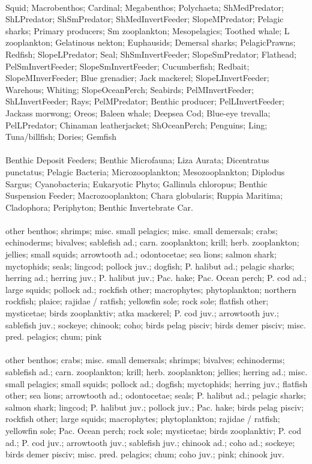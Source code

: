 \fullhline
\hline
{} \\
\hline
Squid; Macrobenthos; Cardinal; Megabenthos; Polychaeta; ShMedPredator; ShLPredator; ShSmPredator; ShMedInvertFeeder; SlopeMPredator; Pelagic sharks; Primary producers; Sm zooplankton; Mesopelagics; Toothed whale; L zooplankton; Gelatinous nekton; Euphausids; Demersal sharks; PelagicPrawns; Redfish; SlopeLPredator; Seal; ShSmInvertFeeder; SlopeSmPredator; Flathead; PelSmInvertFeeder; SlopeSmInvertFeeder; Cucumberfish; Redbait; SlopeMInverFeeder; Blue grenadier; Jack mackerel; SlopeLInvertFeeder; Warehous; Whiting; SlopeOceanPerch; Seabirds; PelMInvertFeeder; ShLInvertFeeder; Rays; PelMPredator; Benthic producer; PelLInvertFeeder; Jackass morwong; Oreos; Baleen whale; Deepsea Cod; Blue-eye trevalla; PelLPredator; Chinaman leatherjacket; ShOceanPerch; Penguins; Ling; Tuna/billfish; Dories; Gemfish\\
\fullhline
\hline
{} \\
\hline
Benthic Deposit Feeders; Benthic Microfauna; Liza Aurata; Dicentratus punctatus; Pelagic Bacteria; Microzooplankton; Mesozooplankton; Diplodus Sargus; Cyanobacteria; Eukaryotic Phyto; Gallinula chloropus; Benthic Suspension Feeder; Macrozooplankton; Chara globularis; Ruppia Maritima; Cladophora; Periphyton; Benthic Invertebrate Car.\\
\fullhline
\hline
{} \\
\hline
other benthos; shrimps; misc. small pelagics; misc. small demersals; crabs; echinoderms; bivalves; sablefish ad.; carn. zooplankton; krill; herb. zooplankton; jellies; small squids; arrowtooth ad.; odontocetae; sea lions; salmon shark; myctophids; seals; lingcod; pollock juv.; dogfish; P. halibut ad.; pelagic sharks; herring ad.; herring juv.; P. halibut juv.; Pac. hake; Pac. Ocean perch; P. cod ad.; large squids; pollock ad.; rockfish other; macrophytes; phytoplankton; northern rockfish; plaice; rajidae / ratfish; yellowfin sole; rock sole; flatfish other; mysticetae; birds zooplanktiv; atka mackerel; P. cod juv.; arrowtooth juv.; sablefish juv.; sockeye; chinook; coho; birds pelag pisciv; birds demer pisciv; misc. pred. pelagics; chum; pink\\
\fullhline
\hline
{} \\
\hline
other benthos; crabs; misc. small demersals; shrimps; bivalves; echinoderms; sablefish ad.; carn. zooplankton; krill; herb. zooplankton; jellies; herring ad.; misc. small pelagics; small squids; pollock ad.; dogfish; myctophids; herring juv.; flatfish other; sea lions; arrowtooth ad.; odontocetae; seals; P. halibut ad.; pelagic sharks; salmon shark; lingcod; P. halibut juv.; pollock juv.; Pac. hake; birds pelag pisciv; rockfish other; large squids; macrophytes; phytoplankton; rajidae / ratfish; yellowfin sole; Pac. Ocean perch; rock sole; mysticetae; birds zooplanktiv; P. cod ad.; P. cod juv.; arrowtooth juv.; sablefish juv.; chinook ad.; coho ad.; sockeye; birds demer pisciv; misc. pred. pelagics; chum; coho juv.; pink; chinook juv.\\
